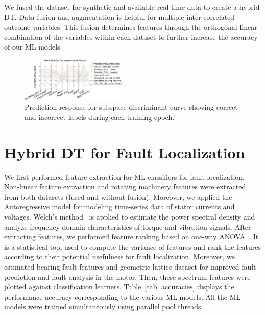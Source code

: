 \documentclass[a4paper,conference]{IEEEtran}
\begin{document}
We fused the dataset for synthetic and available real-time data to create a hybrid DT. Data fusion and augmentation is helpful for multiple inter-correlated outcome variables. This fusion determines features through the orthogonal linear combination of the variables within each dataset to further increase the accuracy of our ML models.
\begin{figure}[t!]
    \centering
    \includegraphics[width=0.45\textwidth]{Figs/JAZZ15.png}
    \caption{Prediction response for subspace discriminant curve showing correct and incorrect labels during each training epoch.}
    \label{fig:fusion_prediction}
\end{figure}
\section{Hybrid DT for Fault Localization} \label{sec:FaulLocalization}
We first performed feature extraction for ML classifiers for fault localization. Non-linear feature extraction and rotating machinery features were extracted from both datasets (fused and without fusion). Moreover, we applied the Autoregressive model for modeling time-series data of stator currents and voltages. Welch's method~\cite{welch1967use} is applied to estimate the power spectral density and analyze frequency domain characteristics of torque and vibration signals. After extracting features, we performed feature ranking based on one-way ANOVA~\cite{st1989analysis}. It is a statistical tool used to compute the variance of features and rank the features according to their potential usefulness for fault localization. Moreover, we estimated bearing fault features and geometric lattice dataset for improved fault prediction and fault analysis in the motor.
Then, these spectrum features were plotted against classification learners. Table~\ref{tab: accuracies} displays the performance accuracy corresponding to the various ML models. All the ML models were trained simultaneously using parallel pool threads. 
\end{document}
